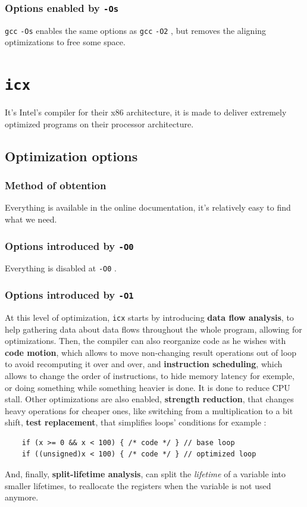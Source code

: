 \documentclass{rapport}
\newcommand{\gcc}{\texttt{gcc} }
\newcommand{\icx}{\texttt{icx} }
\newcommand{\optizero}{\texttt{-O0} }
\newcommand{\optione}{\texttt{-O1} }
\newcommand{\optitwo}{\texttt{-O2} }
\newcommand{\optisize}{\texttt{-Os} }
\begin{document}
\subsubsection{Options enabled by \optisize}
\gcc \optisize enables the same options as \gcc \optitwo, but removes the aligning optimizations to free some space.






\section{\icx}
It's Intel's compiler for their x86 architecture, it is made to deliver extremely optimized programs on their processor architecture.
\subsection{Optimization options}
\subsubsection{Method of obtention}
Everything is available in the online documentation, it's relatively easy to find what we need.
\subsubsection{Options introduced by \optizero}
Everything is disabled at \optizero.
\subsubsection{Options introduced by \optione}
At this level of optimization, \icx starts by introducing \textbf{data flow analysis}, to help gathering data about data flows throughout the whole program, 
allowing for optimizations.\newline
Then, the compiler can also reorganize code as he wishes with \textbf{code motion}, which allows to move non-changing result operations out of loop to avoid 
recomputing it over and over, and \textbf{instruction scheduling}, which allows to change the order of instructions, to hide memory latency for exemple, 
or doing something while something heavier is done. It is done to reduce CPU stall.
\newline\newline
Other optimizations are also enabled, \textbf{strength reduction}, that changes heavy operations for cheaper ones, like switching from a multiplication to a bit shift, \textbf{test replacement}, that simplifies loops' conditions for example : 
\begin{verbatim}
    if (x >= 0 && x < 100) { /* code */ } // base loop
    if ((unsigned)x < 100) { /* code */ } // optimized loop
\end{verbatim}
And, finally, \textbf{split-lifetime analysis}, can split the \textit{lifetime} of a variable into smaller lifetimes, to reallocate the registers when the variable is not used anymore.
\end{document}
